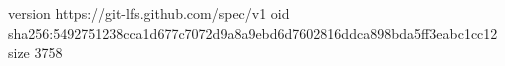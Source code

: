 version https://git-lfs.github.com/spec/v1
oid sha256:5492751238cca1d677c7072d9a8a9ebd6d7602816ddca898bda5ff3eabc1cc12
size 3758
